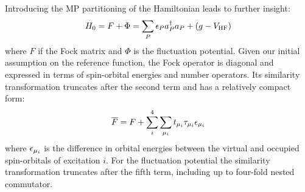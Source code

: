 Introducing the \acrlong*{MP} partitioning of the Hamiltonian leads to
further insight:
\begin{equation}
 H_0 = F + \Phi = \sum_P\epsilon_Pa_{P}^{\dagger}a_{P} + (g- V_\mathrm{HF})
\end{equation}
where $F$ if the Fock matrix and $\Phi$ is the fluctuation potential.
Given our initial assumption on the reference function, the Fock
operator is diagonal and expressed in terms of spin-orbital energies and
number operators.
Its similarity transformation truncates after the second term and has a
relatively compact form:
\begin{equation}
  \overline{F} = F + \sum_{i}^4\sum_{\mu_i}t_{\mu_i}\tau_{\mu_i}\epsilon_{\mu_i}
\end{equation}
where $\epsilon_{\mu_i}$ is the difference in orbital energies between the
virtual and occupied spin-orbitals of excitation $i$.
For the fluctuation potential the similarity transformation truncates
after the fifth term, including up to four-fold nested commutator.

